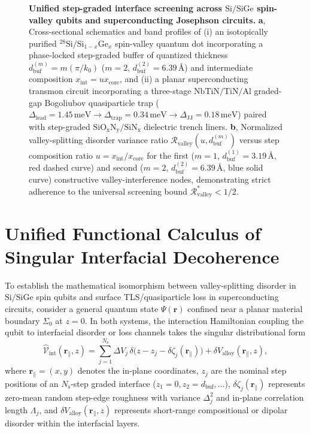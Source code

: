 \documentclass[11pt,letterpaper]{article}
\theoremstyle{definition}
\begin{document}
\begin{figure}[t!]
  \centering
  
  \caption{\textbf{Unified step-graded interface screening across $\mathrm{Si/SiGe}$ spin-valley qubits and superconducting Josephson circuits.} \textbf{a}, Cross-sectional schematics and band profiles of (i) an isotopically purified ${}^{28}\mathrm{Si}/\mathrm{Si}_{1-x}\mathrm{Ge}_x$ spin-valley quantum dot incorporating a phase-locked step-graded buffer of quantized thickness $d_{\mathrm{buf}}^{(m)} = m(\pi/k_0)$ ($m=2$, $d_{\mathrm{buf}}^{(2)} = 6.39\,\text{\AA}$) and intermediate composition $x_{\mathrm{int}} = u x_{\mathrm{core}}$, and (ii) a planar superconducting transmon circuit incorporating a three-stage $\mathrm{NbTiN/TiN/Al}$ graded-gap Bogoliubov quasiparticle trap ($\Delta_{\mathrm{lead}} = 1.45\,\mathrm{meV} \to \Delta_{\mathrm{trap}} = 0.34\,\mathrm{meV} \to \Delta_{\mathrm{JJ}} = 0.18\,\mathrm{meV}$) paired with step-graded $\mathrm{SiO_xN_y/SiN_x}$ dielectric trench liners. \textbf{b}, Normalized valley-splitting disorder variance ratio $\mathcal{R}_{\mathrm{valley}}(u, d_{\mathrm{buf}}^{(m)})$ versus step composition ratio $u = x_{\mathrm{int}}/x_{\mathrm{core}}$ for the first ($m=1$, $d_{\mathrm{buf}}^{(1)} = 3.19\,\text{\AA}$, red dashed curve) and second ($m=2$, $d_{\mathrm{buf}}^{(2)} = 6.39\,\text{\AA}$, blue solid curve) constructive valley-interference nodes, demonstrating strict adherence to the universal screening bound $\mathcal{R}_{\mathrm{valley}}^* < 1/2$.}
  \label{fig:dual_architectures}
\end{figure}


\section{Unified Functional Calculus of Singular Interfacial Decoherence}
\label{sec:functional_calculus}

To establish the mathematical isomorphism between valley-splitting disorder in $\mathrm{Si/SiGe}$ spin qubits and surface TLS/quasiparticle loss in superconducting circuits, consider a general quantum state $\Psi(\mathbf{r})$ confined near a planar material boundary $\Sigma_0$ at $z = 0$. In both systems, the interaction Hamiltonian coupling the qubit to interfacial disorder or loss channels takes the singular distributional form
\begin{equation}
  \hat{\mathcal{V}}_{\mathrm{int}}(\mathbf{r}_\parallel, z) = \sum_{j=1}^{N_{\mathrm{s}}} \Delta V_j \, \delta\bigl(z - z_j - \delta\zeta_j(\mathbf{r}_\parallel)\bigr) + \delta V_{\mathrm{alloy}}(\mathbf{r}_\parallel, z),
  \label{eq:general_singular_potential}
\end{equation}
where $\mathbf{r}_\parallel = (x,y)$ denotes the in-plane coordinates, $z_j$ are the nominal step positions of an $N_{\mathrm{s}}$-step graded interface ($z_1 = 0, z_2 = d_{\mathrm{buf}}, \dots$), $\delta\zeta_j(\mathbf{r}_\parallel)$ represents zero-mean random step-edge roughness with variance $\Delta_j^2$ and in-plane correlation length $\Lambda_j$, and $\delta V_{\mathrm{alloy}}(\mathbf{r}_\parallel, z)$ represents short-range compositional or dipolar disorder within the interfacial layers.
\end{document}
